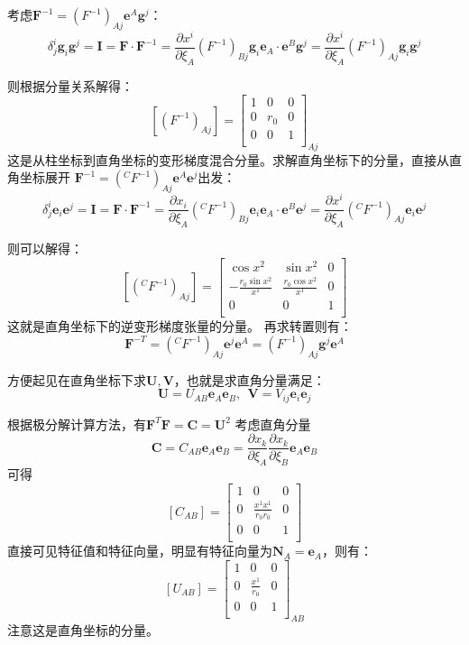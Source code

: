 \documentclass[UTF8,zihao=5]{ctexart}
\newcommand{\bm}[1]{{\mathbf{#1}}}
\newcommand*{\pd}[2]{\frac{\partial #1}{\partial #2}}
\begin{document}
考虑$\bm{F}^{-1}=(F^{-1})_{Aj}\bm{e}^{A}\bm{g}^{j}$：
$$
    \delta^i_j\bm{g}_i\bm{g}^j=\bm{I}=\bm{F}\cdot\bm{F}^{-1}
    =\pd{x^i}{\xi_A}(F^{-1})_{Bj}\bm{g}_i\bm{e}_A\cdot\bm{e}^{B}\bm{g}^{j}
    =\pd{x^i}{\xi_A}(F^{-1})_{Aj}\bm{g}_i\bm{g}^{j}
$$

则根据分量关系解得：
$$
    [(F^{-1})_{Aj}]=\begin{bmatrix}
        1 & 0   & 0 \\
        0 & r_0 & 0 \\
        0 & 0   & 1 \\
    \end{bmatrix}_{Aj}
$$
这是从柱坐标到直角坐标的变形梯度混合分量。求解直角坐标下的分量，直接从直角坐标展开
$\bm{F}^{-1}=(^CF^{-1})_{Aj}\bm{e}^{A}\bm{e}^{j}$出发：
$$
    \delta^i_j\bm{e}_i\bm{e}^j=\bm{I}=\bm{F}\cdot\bm{F}^{-1}
    =\pd{x_i}{\xi_A}(^CF^{-1})_{Bj}\bm{e}_i\bm{e}_A\cdot\bm{e}^{B}\bm{e}^{j}
    =\pd{x^i}{\xi_A}(^CF^{-1})_{Aj}\bm{e}_i\bm{e}^{j}
$$

则可以解得：
$$
    [(^CF^{-1})_{Aj}]=
    \begin{bmatrix}
        \cos{x^2}                 & \sin{x^2}                & 0 \\
        -\frac{r_0\sin{x^2}}{x^1} & \frac{r_0\cos{x^2}}{x^1} & 0 \\
        0                         & 0                        & 1 \\
    \end{bmatrix}
$$
这就是直角坐标下的逆变形梯度张量的分量。
再求转置则有：
$$
    \bm{F}^{-T}=(^CF^{-1})_{Aj}\bm{e}^{j}\bm{e}^{A}
    =(F^{-1})_{Aj}\bm{g}^{j}\bm{e}^{A}
$$

方便起见在直角坐标下求$\bm{U},\bm{V}$，也就是求直角分量满足：
$$
    \bm{U}=U_{AB}\bm{e}_A\bm{e}_B,\ \ \bm{V}=V_{ij}\bm{e}_i\bm{e}_j
$$

根据极分解计算方法，有$\bm{F}^T\bm{F}=\bm{C}=\bm{U}^2$
考虑直角分量
$$
    \bm{C}=C_{AB}\bm{e}_A\bm{e}_B=\pd{x_k}{\xi_A}\pd{x_k}{\xi_B}\bm{e}_A\bm{e}_B
$$
可得
$$
    [C_{AB}]=\begin{bmatrix}
        1 & 0                     & 0 \\
        0 & \frac{x^1x^1}{r_0r_0} & 0 \\
        0 & 0                     & 1 \\
    \end{bmatrix}
$$
直接可见特征值和特征向量，明显有特征向量为$\bm{N}_A=\bm{e}_A$，则有：
$$
    [U_{AB}]=\begin{bmatrix}
        1 & 0               & 0 \\
        0 & \frac{x^1}{r_0} & 0 \\
        0 & 0               & 1 \\
    \end{bmatrix}_{AB}
$$
注意这是直角坐标的分量。
\end{document}
